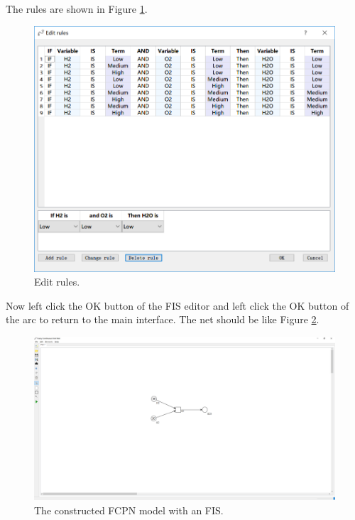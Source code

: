 \documentclass[journal,a4paper,onecolumn]{article}
\begin{document}
The rules are shown in Figure \ref{fig:Edit rules}.

\begin{figure}[!hbt]
	\begin{center}
		\includegraphics[width=\columnwidth]{fig10}
		\caption{Edit rules.}
		\label{fig:Edit rules}
	\end{center}
\end{figure}

Now left click the OK button of the FIS editor and left click the OK button of the arc to return to the main interface. The net should be like Figure \ref{fig:After FIS}.

\begin{figure}[!hbt]
	\begin{center}
		\includegraphics[width=\columnwidth]{fig6}
		\caption{The constructed FCPN model with an FIS.}
		\label{fig:After FIS}
	\end{center}
\end{figure}
\end{document}
